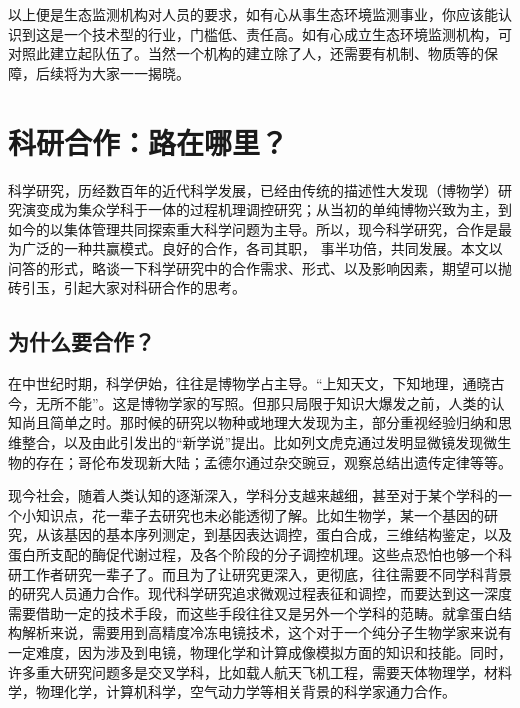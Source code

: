 \documentclass[
]{book}
\begin{document}
以上便是生态监测机构对人员的要求，如有心从事生态环境监测事业，你应该能认识到这是一个技术型的行业，门槛低、责任高。如有心成立生态环境监测机构，可对照此建立起队伍了。当然一个机构的建立除了人，还需要有机制、物质等的保障，后续将为大家一一揭晓。

\hypertarget{ux79d1ux7814ux5408ux4f5cux8defux5728ux54eaux91cc}{%
\section{科研合作：路在哪里？}\label{ux79d1ux7814ux5408ux4f5cux8defux5728ux54eaux91cc}}

科学研究，历经数百年的近代科学发展，已经由传统的描述性大发现（博物学）研究演变成为集众学科于一体的过程机理调控研究；从当初的单纯博物兴致为主，到如今的以集体管理共同探索重大科学问题为主导。所以，现今科学研究，合作是最为广泛的一种共赢模式。良好的合作，各司其职， 事半功倍，共同发展。本文以问答的形式，略谈一下科学研究中的合作需求、形式、以及影响因素，期望可以抛砖引玉，引起大家对科研合作的思考。

\hypertarget{ux4e3aux4ec0ux4e48ux8981ux5408ux4f5c}{%
\subsection{为什么要合作？}\label{ux4e3aux4ec0ux4e48ux8981ux5408ux4f5c}}

在中世纪时期，科学伊始，往往是博物学占主导。``上知天文，下知地理，通晓古今，无所不能''。这是博物学家的写照。但那只局限于知识大爆发之前，人类的认知尚且简单之时。那时候的研究以物种或地理大发现为主，部分重视经验归纳和思维整合，以及由此引发出的``新学说''提出。比如列文虎克通过发明显微镜发现微生物的存在；哥伦布发现新大陆；孟德尔通过杂交豌豆，观察总结出遗传定律等等。

现今社会，随着人类认知的逐渐深入，学科分支越来越细，甚至对于某个学科的一个小知识点，花一辈子去研究也未必能透彻了解。比如生物学，某一个基因的研究，从该基因的基本序列测定，到基因表达调控，蛋白合成，三维结构鉴定，以及蛋白所支配的酶促代谢过程，及各个阶段的分子调控机理。这些点恐怕也够一个科研工作者研究一辈子了。而且为了让研究更深入，更彻底，往往需要不同学科背景的研究人员通力合作。现代科学研究追求微观过程表征和调控，而要达到这一深度需要借助一定的技术手段，而这些手段往往又是另外一个学科的范畴。就拿蛋白结构解析来说，需要用到高精度冷冻电镜技术，这个对于一个纯分子生物学家来说有一定难度，因为涉及到电镜，物理化学和计算成像模拟方面的知识和技能。同时，许多重大研究问题多是交叉学科，比如载人航天飞机工程，需要天体物理学，材料学，物理化学，计算机科学，空气动力学等相关背景的科学家通力合作。
\end{document}
